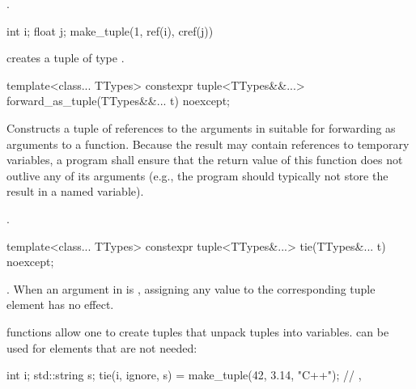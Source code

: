 \begin{itemdescr}
\pnum
\returns {}.

\pnum
\begin{example}
\begin{codeblock}
int i; float j;
make_tuple(1, ref(i), cref(j))
\end{codeblock}
creates a tuple of type .
\end{example}
\end{itemdescr}

%
%
\begin{itemdecl}
template<class... TTypes>
  constexpr tuple<TTypes&&...> forward_as_tuple(TTypes&&... t) noexcept;
\end{itemdecl}

\begin{itemdescr}
\pnum
\effects Constructs a tuple of references to the arguments in  suitable
for forwarding as arguments to a function. Because the result may contain references
to temporary variables, a program shall ensure that the return value of this
function does not outlive any of its arguments (e.g., the program should typically
not store the result in a named variable).

\pnum
\returns {}.
\end{itemdescr}

%
%
%
\begin{itemdecl}
template<class... TTypes>
  constexpr tuple<TTypes&...> tie(TTypes&... t) noexcept;
\end{itemdecl}

\begin{itemdescr}
\pnum
\returns {}.  When an
argument in  is , assigning
any value to the corresponding tuple element has no effect.

\pnum
\begin{example}
 functions allow one to create tuples that unpack
tuples into variables.  can be used for elements that
are not needed:
\begin{codeblock}
int i; std::string s;
tie(i, ignore, s) = make_tuple(42, 3.14, "C++");
// , 
\end{codeblock}
\end{example}
\end{itemdescr}


